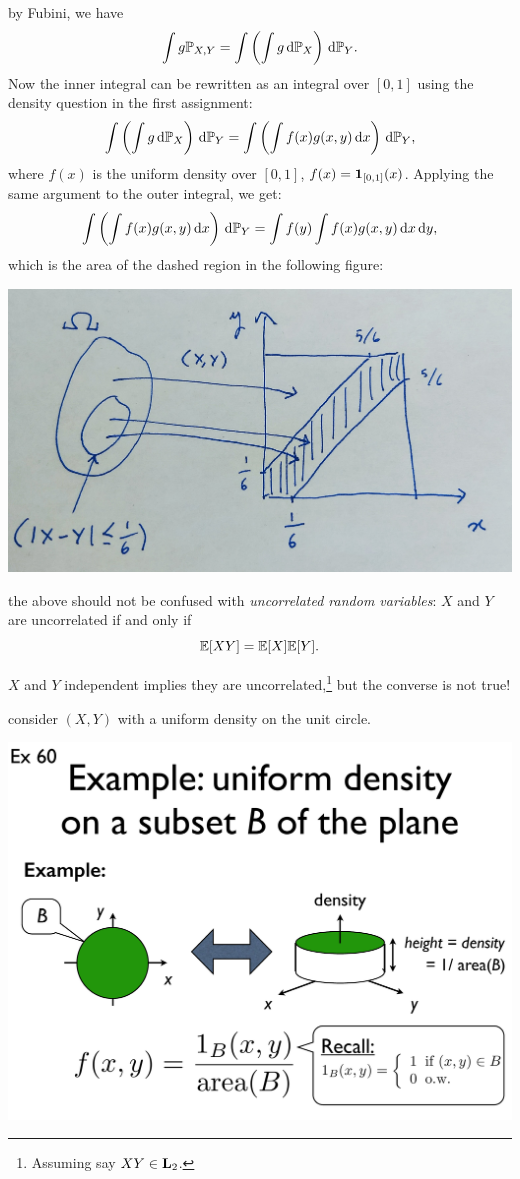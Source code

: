 \documentclass{article}
\begin{document}
 by Fubini, we have
\[ \int g {\mathbb P}_{X,Y} = \int \left( \int g \,\mathrm{d} {\mathbb P}_X \right) \,\mathrm{d} {\mathbb P}_Y. \]
Now the inner integral can be rewritten as an integral over $[0, 1]$ using the density question in the first assignment:
\[ \int \left( \int g \,\mathrm{d} {\mathbb P}_X \right) \,\mathrm{d} {\mathbb P}_Y = \int \left( \int f(x) g(x,y) \,\mathrm{d} x \right) \,\mathrm{d} {\mathbb P}_Y, \]
where $f(x)$ is the uniform density over $[0, 1]$, $f(x) = {\mathbf 1}_{[0, 1]}(x)$. Applying the same argument to the outer integral, we get:
\[ \int \left( \int f(x) g(x,y) \,\mathrm{d} x \right) \,\mathrm{d} {\mathbb P}_Y = \int f(y) \int f(x) g(x,y) \,\mathrm{d} x \,\mathrm{d} y, \]
which is the area of the dashed region in the following figure: 
\begin{center}
	\includegraphics[width=0.5\linewidth]{figures/meeting}
\end{center}

 the above should not be confused with \emph{uncorrelated random variables}: $X$ and $Y$ are uncorrelated if and only if \[ {\mathbb E}[XY] = {\mathbb E}[X] {\mathbb E}[Y]. \]

 $X$ and $Y$ independent implies they are uncorrelated,\footnote{Assuming say $XY \in \mathbf L_2$.} but the converse is not true!

 consider $(X,Y)$ with a uniform density on the unit circle. 
\begin{center}
\includegraphics[width=0.7\linewidth]{figures/uniform-on-circle}
\end{center}
\end{document}
